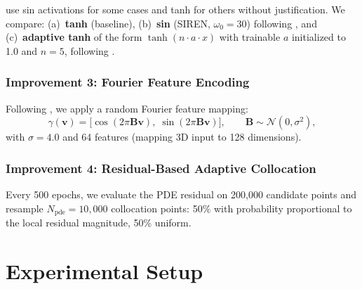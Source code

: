 \documentclass[11pt, letterpaper]{article}
\begin{document}
\citet{rashtbehesht2022} use sin activations for some cases and tanh for others without justification.
We compare: (a)~\textbf{tanh} (baseline), (b)~\textbf{sin} (SIREN, $\omega_0 = 30$) following \citet{sitzmann2020implicit}, and (c)~\textbf{adaptive tanh} of the form $\tanh(n \cdot a \cdot x)$ with trainable $a$ initialized to 1.0 and $n = 5$, following \citet{jagtap2020adaptive}.

\subsubsection{Improvement 3: Fourier Feature Encoding}
\label{sec:fourier}

Following \citet{tancik2020fourier}, we apply a random Fourier feature mapping:
\begin{equation}
  \gamma(\mathbf{v}) = \bigl[\cos(2\pi \mathbf{B}\mathbf{v}),\;
\sin(2\pi \mathbf{B}\mathbf{v})\bigr],
  \qquad \mathbf{B} \sim \mathcal{N}(0, \sigma^2),
  \label{eq:rff}
\end{equation}
with $\sigma = 4.0$ and 64 features (mapping 3D input to 128 dimensions).

\subsubsection{Improvement 4: Residual-Based Adaptive Collocation}
\label{sec:adaptive-colloc}

Every 500 epochs, we evaluate the PDE residual on 200{,}000 candidate points and resample $N_{\text{pde}} = 10{,}000$ collocation points: 50\% with probability proportional to the local residual magnitude, 50\% uniform.

\section{Experimental Setup}
\label{sec:setup}
\end{document}
